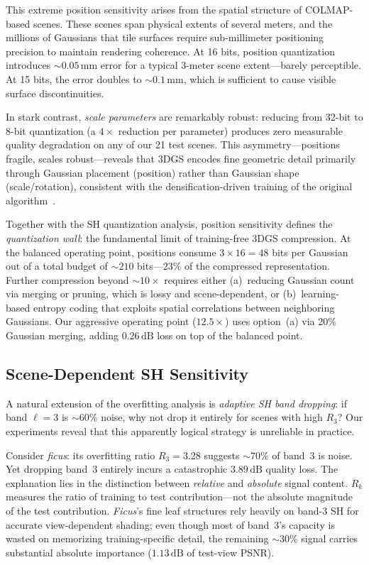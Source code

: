 \documentclass[sigconf,review]{acmart}
\newcommand{\dB}{\,\text{dB}}
\newcommand{\R}[1]{R_{#1}}
\begin{document}
This extreme position sensitivity arises from the spatial structure of COLMAP-based scenes.
These scenes span physical extents of several meters, and the millions of Gaussians that tile surfaces require sub-millimeter positioning precision to maintain rendering coherence.
At 16 bits, position quantization introduces ${\sim}0.05$\,mm error for a typical 3-meter scene extent---barely perceptible.
At 15 bits, the error doubles to ${\sim}0.1$\,mm, which is sufficient to cause visible surface discontinuities.

In stark contrast, \emph{scale parameters} are remarkably robust: reducing from 32-bit to 8-bit quantization (a $4{\times}$ reduction per parameter) produces zero measurable quality degradation on any of our 21 test scenes.
This asymmetry---positions fragile, scales robust---reveals that 3DGS encodes fine geometric detail primarily through Gaussian placement (position) rather than Gaussian shape (scale/rotation), consistent with the densification-driven training of the original algorithm~\cite{kerbl2023gaussians}.

Together with the SH quantization analysis, position sensitivity defines the \emph{quantization wall}: the fundamental limit of training-free 3DGS compression.
At the balanced operating point, positions consume $3 \times 16 = 48$ bits per Gaussian out of a total budget of ${\sim}210$ bits---23\% of the compressed representation.
Further compression beyond ${\sim}10{\times}$ requires either (a)~reducing Gaussian count via merging or pruning, which is lossy and scene-dependent, or (b)~learning-based entropy coding that exploits spatial correlations between neighboring Gaussians.
Our aggressive operating point ($12.5{\times}$) uses option~(a) via 20\% Gaussian merging, adding $0.26\dB$ loss on top of the balanced point.

\subsection{Scene-Dependent SH Sensitivity}
\label{sec:scenedep}

A natural extension of the overfitting analysis is \emph{adaptive SH band dropping}: if band $\ell{=}3$ is ${\sim}60\%$ noise, why not drop it entirely for scenes with high $\R{3}$?
Our experiments reveal that this apparently logical strategy is unreliable in practice.

Consider \textit{ficus}: its overfitting ratio $\R{3}{=}3.28$ suggests ${\sim}70\%$ of band~3 is noise.
Yet dropping band~3 entirely incurs a catastrophic $3.89\dB$ quality loss.
The explanation lies in the distinction between \emph{relative} and \emph{absolute} signal content.
$\R{k}$ measures the ratio of training to test contribution---not the absolute magnitude of the test contribution.
\textit{Ficus}'s fine leaf structures rely heavily on band-3 SH for accurate view-dependent shading; even though most of band~3's capacity is wasted on memorizing training-specific detail, the remaining ${\sim}30\%$ signal carries substantial absolute importance ($1.13\dB$ of test-view PSNR).
\end{document}
